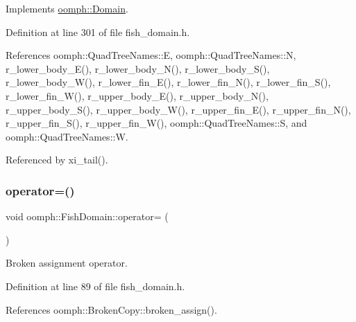 Implements \hyperlink{classoomph_1_1Domain_a95f3e00d28ea37e6c4d3027bfac91096}{oomph\+::\+Domain}.



Definition at line 301 of file fish\+\_\+domain.\+h.



References oomph\+::\+Quad\+Tree\+Names\+::E, oomph\+::\+Quad\+Tree\+Names\+::N, r\+\_\+lower\+\_\+body\+\_\+\+E(), r\+\_\+lower\+\_\+body\+\_\+\+N(), r\+\_\+lower\+\_\+body\+\_\+\+S(), r\+\_\+lower\+\_\+body\+\_\+\+W(), r\+\_\+lower\+\_\+fin\+\_\+\+E(), r\+\_\+lower\+\_\+fin\+\_\+\+N(), r\+\_\+lower\+\_\+fin\+\_\+\+S(), r\+\_\+lower\+\_\+fin\+\_\+\+W(), r\+\_\+upper\+\_\+body\+\_\+\+E(), r\+\_\+upper\+\_\+body\+\_\+\+N(), r\+\_\+upper\+\_\+body\+\_\+\+S(), r\+\_\+upper\+\_\+body\+\_\+\+W(), r\+\_\+upper\+\_\+fin\+\_\+\+E(), r\+\_\+upper\+\_\+fin\+\_\+\+N(), r\+\_\+upper\+\_\+fin\+\_\+\+S(), r\+\_\+upper\+\_\+fin\+\_\+\+W(), oomph\+::\+Quad\+Tree\+Names\+::S, and oomph\+::\+Quad\+Tree\+Names\+::W.



Referenced by xi\+\_\+tail().

\mbox{\label{classoomph_1_1FishDomain_a87fdf6ae5c6d51e2dcd1aecb494ddaee}} 
\subsubsection{\texorpdfstring{operator=()}{operator=()}}
{\footnotesize\ttfamily void oomph\+::\+Fish\+Domain\+::operator= (\begin{DoxyParamCaption}\item[{const \hyperlink{classoomph_1_1FishDomain}{Fish\+Domain} \&}]{ }\end{DoxyParamCaption})\hspace{0.3cm}{\ttfamily [inline]}}



Broken assignment operator. 



Definition at line 89 of file fish\+\_\+domain.\+h.



References oomph\+::\+Broken\+Copy\+::broken\+\_\+assign().

\mbox{\label{classoomph_1_1FishDomain_abb85a2acd9cf3cd8fae60fd9e487bd1c}} 
